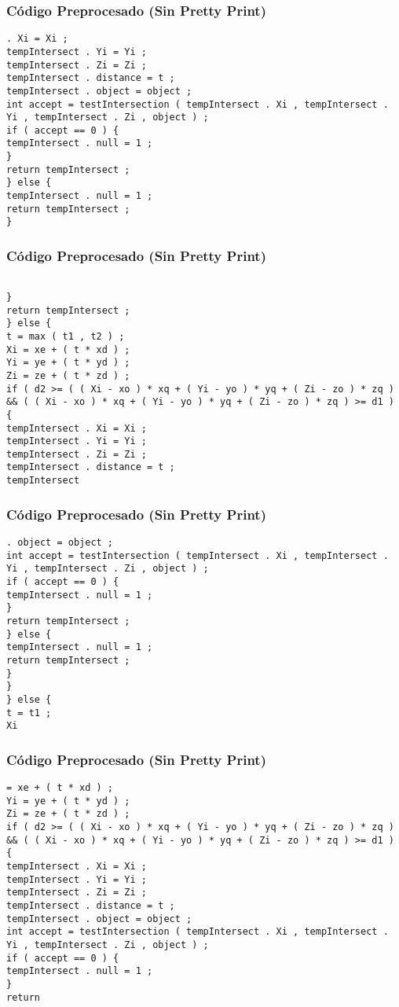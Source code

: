 \documentclass{beamer}
\begin{document}
\begin{frame}[fragile]
\frametitle{C\'odigo Preprocesado (Sin Pretty Print)}
\begin{lstlisting}[style=CStyle]
. Xi = Xi ; 
tempIntersect . Yi = Yi ; 
tempIntersect . Zi = Zi ; 
tempIntersect . distance = t ; 
tempIntersect . object = object ; 
int accept = testIntersection ( tempIntersect . Xi , tempIntersect . Yi , tempIntersect . Zi , object ) ; 
if ( accept == 0 ) { 
tempIntersect . null = 1 ; 
} 
return tempIntersect ; 
} else { 
tempIntersect . null = 1 ; 
return tempIntersect ; 
} \end{lstlisting}
\end{frame}
\begin{frame}[fragile]
\frametitle{C\'odigo Preprocesado (Sin Pretty Print)}
\begin{lstlisting}[style=CStyle]

} 
return tempIntersect ; 
} else { 
t = max ( t1 , t2 ) ; 
Xi = xe + ( t * xd ) ; 
Yi = ye + ( t * yd ) ; 
Zi = ze + ( t * zd ) ; 
if ( d2 >= ( ( Xi - xo ) * xq + ( Yi - yo ) * yq + ( Zi - zo ) * zq ) && ( ( Xi - xo ) * xq + ( Yi - yo ) * yq + ( Zi - zo ) * zq ) >= d1 ) { 
tempIntersect . Xi = Xi ; 
tempIntersect . Yi = Yi ; 
tempIntersect . Zi = Zi ; 
tempIntersect . distance = t ; 
tempIntersect \end{lstlisting}
\end{frame}
\begin{frame}[fragile]
\frametitle{C\'odigo Preprocesado (Sin Pretty Print)}
\begin{lstlisting}[style=CStyle]
. object = object ; 
int accept = testIntersection ( tempIntersect . Xi , tempIntersect . Yi , tempIntersect . Zi , object ) ; 
if ( accept == 0 ) { 
tempIntersect . null = 1 ; 
} 
return tempIntersect ; 
} else { 
tempIntersect . null = 1 ; 
return tempIntersect ; 
} 
} 
} else { 
t = t1 ; 
Xi \end{lstlisting}
\end{frame}
\begin{frame}[fragile]
\frametitle{C\'odigo Preprocesado (Sin Pretty Print)}
\begin{lstlisting}[style=CStyle]
= xe + ( t * xd ) ; 
Yi = ye + ( t * yd ) ; 
Zi = ze + ( t * zd ) ; 
if ( d2 >= ( ( Xi - xo ) * xq + ( Yi - yo ) * yq + ( Zi - zo ) * zq ) && ( ( Xi - xo ) * xq + ( Yi - yo ) * yq + ( Zi - zo ) * zq ) >= d1 ) { 
tempIntersect . Xi = Xi ; 
tempIntersect . Yi = Yi ; 
tempIntersect . Zi = Zi ; 
tempIntersect . distance = t ; 
tempIntersect . object = object ; 
int accept = testIntersection ( tempIntersect . Xi , tempIntersect . Yi , tempIntersect . Zi , object ) ; 
if ( accept == 0 ) { 
tempIntersect . null = 1 ; 
} 
return \end{lstlisting}
\end{frame}
\end{document}
